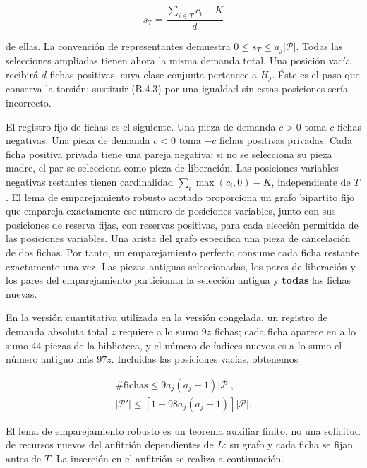 \documentclass[spanish,11pt,a4paper]{article}
\begin{document}
\[s_T=\frac{\sum_{i\in T}c_i-K}{d}\]

de ellas. La convención de representantes demuestra \(0\le s_T\le a_j|\mathcal P|\). Todas las selecciones ampliadas tienen ahora la misma demanda total. Una posición vacía recibirá \(d\) fichas positivas, cuya clase conjunta pertenece a \(H_j\). Éste es el paso que conserva la torsión; sustituir (B.4.3) por una igualdad sin estas posiciones sería incorrecto.

El registro fijo de fichas es el siguiente. Una pieza de demanda \(c>0\) toma \(c\) fichas negativas. Una pieza de demanda \(c<0\) toma \(-c\) fichas positivas privadas. Cada ficha positiva privada tiene una pareja negativa; si no se selecciona su pieza madre, el par se selecciona como pieza de liberación. Las posiciones variables negativas restantes tienen cardinalidad \(\sum_i\max(c_i,0)-K\), independiente de \(T\). El lema de emparejamiento robusto acotado proporciona un grafo bipartito fijo que empareja exactamente ese número de posiciones variables, junto con sus posiciones de reserva fijas, con reservas positivas, para cada elección permitida de las posiciones variables. Una arista del grafo especifica una pieza de cancelación de dos fichas. Por tanto, un emparejamiento perfecto consume cada ficha restante exactamente una vez. Las piezas antiguas seleccionadas, los pares de liberación y los pares del emparejamiento particionan la selección antigua y \textbf{todas} las fichas nuevas.

En la versión cuantitativa utilizada en la versión congelada, un registro de demanda absoluta total \(z\) requiere a lo sumo \(9z\) fichas; cada ficha aparece en a lo sumo 44 piezas de la biblioteca, y el número de índices nuevos es a lo sumo el número antiguo más \(97z\). Incluidas las posiciones vacías, obtenemos

\[\begin{gathered}
\#\text{fichas}\le9a_j(a_j+1)|\mathcal P|,\\
|\mathcal P'|\le[1+98a_j(a_j+1)]|\mathcal P|.
\end{gathered}
\tag{B.4.4}\]

El lema de emparejamiento robusto es un teorema auxiliar finito, no una solicitud de recursos nuevos del anfitrión dependientes de \(L\): su grafo y cada ficha se fijan antes de \(T\). La inserción en el anfitrión se realiza a continuación.
\end{document}
